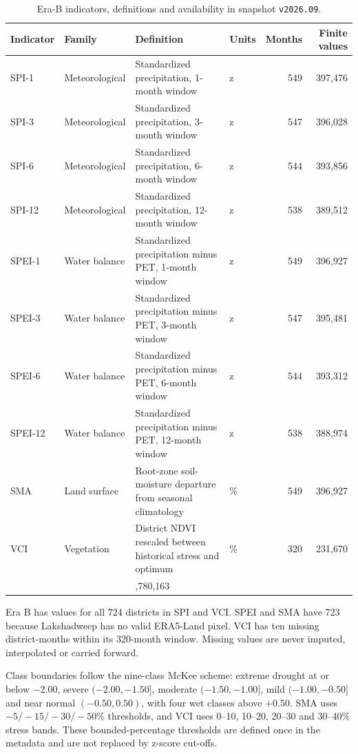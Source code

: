 \documentclass[10pt,a4paper]{article}
\begin{document}
\begin{table}[t]
\caption{Era-B indicators, definitions and availability in snapshot \texttt{v2026.09}.}
\label{tab:indicators}
\small
\begin{tabularx}{\textwidth}{@{}>{\RaggedRight\arraybackslash}l>{\RaggedRight\arraybackslash}l>{\RaggedRight\arraybackslash}X>{\RaggedRight\arraybackslash}lrr@{}}
\toprule
Indicator & Family & Definition & Units & Months & Finite values \\
\midrule
SPI-1 & Meteorological & Standardized precipitation, 1-month window & z & 549 & 397,476 \\
SPI-3 & Meteorological & Standardized precipitation, 3-month window & z & 547 & 396,028 \\
SPI-6 & Meteorological & Standardized precipitation, 6-month window & z & 544 & 393,856 \\
SPI-12 & Meteorological & Standardized precipitation, 12-month window & z & 538 & 389,512 \\
SPEI-1 & Water balance & Standardized precipitation minus PET, 1-month window & z & 549 & 396,927 \\
SPEI-3 & Water balance & Standardized precipitation minus PET, 3-month window & z & 547 & 395,481 \\
SPEI-6 & Water balance & Standardized precipitation minus PET, 6-month window & z & 544 & 393,312 \\
SPEI-12 & Water balance & Standardized precipitation minus PET, 12-month window & z & 538 & 388,974 \\
SMA & Land surface & Root-zone soil-moisture departure from seasonal climatology & \% & 549 & 396,927 \\
VCI & Vegetation & District NDVI rescaled between historical stress and optimum & \% & 320 & 231,670 \\
\midrule
\multicolumn{4}{@{}l}{Total valid district-month values} & & 3,780,163 \\
\bottomrule
\end{tabularx}
\end{table}

Era B has values for all 724 districts in SPI and VCI. SPEI and SMA have 723 because Lakshadweep has no valid ERA5-Land pixel. VCI has ten missing district-months within its 320-month window. Missing values are never imputed, interpolated or carried forward.

Class boundaries follow the nine-class McKee scheme: extreme drought at or below $-2.00$, severe $(-2.00,-1.50]$, moderate $(-1.50,-1.00]$, mild $(-1.00,-0.50]$ and near normal $(-0.50,0.50)$, with four wet classes above $+0.50$. SMA uses $-5/-15/-30/-50$\% thresholds, and VCI uses 0--10, 10--20, 20--30 and 30--40\% stress bands. These bounded-percentage thresholds are defined once in the metadata and are not replaced by z-score cut-offs.
\end{document}
